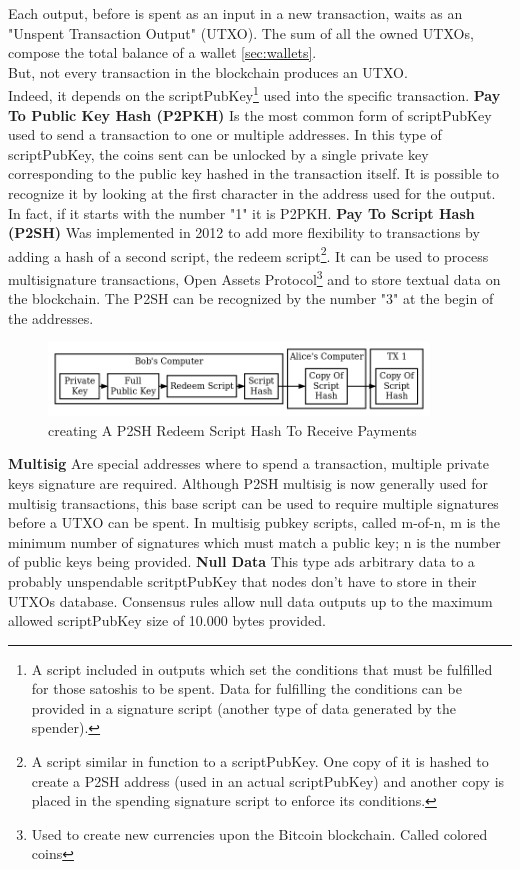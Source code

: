 Each output, before is spent as an input in a new transaction, waits as an "Unspent
Transaction Output" (UTXO). The sum of all the owned UTXOs, compose the total balance
of a wallet \ref{sec:wallets}.\\
But, not every transaction in the blockchain produces an UTXO.\\ 
Indeed, it depends on 
the scriptPubKey\footnote{A script included in outputs which set the conditions that 
must be fulfilled for those satoshis to be spent. Data for fulfilling the conditions 
can be provided in a signature script (another type of data generated by the spender).}
used into the specific transaction.
\bigskip 
\textbf{Pay To Public Key Hash (P2PKH)} 
Is the most common form of scriptPubKey used to send a transaction to one or multiple 
addresses. In this type of scriptPubKey, the coins sent can be unlocked by a single 
private key corresponding to the public key hashed in the transaction itself. It is 
possible to recognize it by looking at the first character in the address used for the
output. In fact, if it starts with the number "1" it is P2PKH.\cite{bitcoin.org}\pagebreak
\bigskip 
\textbf{Pay To Script Hash (P2SH)}
Was implemented in 2012 to add more flexibility to transactions by adding a hash 
of a second script, the redeem script\footnote{A script similar in function to a 
scriptPubKey. One copy of it is hashed to create a P2SH address (used in an actual 
scriptPubKey) and another copy is placed in the spending signature script to enforce 
its conditions.}. It can be used to process multisignature transactions, 
Open Assets Protocol\footnote{Used to create new currencies upon the Bitcoin blockchain. 
Called colored coins} and to store textual data on the blockchain. The P2SH can 
be recognized by the number "3" at the begin of the addresses.\cite{bitcoin.org}\\

\begin{figure}[h]
    \centering
    \includegraphics[width = 0.9\textwidth]{p2sh.png}
    \caption{creating A P2SH Redeem Script Hash To Receive Payments \cite{bitcoin.org}}
    \label{fig:p2sh}
\end{figure}\bigskip
\textbf{Multisig}
Are special addresses where to spend a transaction, multiple private keys signature are required.
Although P2SH multisig is now generally used for multisig transactions, this base 
script can be used to require multiple signatures before a UTXO can be spent.
In multisig pubkey scripts, called m-of-n, m is the minimum number of signatures 
which must match a public key; n is the number of public keys being provided.\cite{bitcoin.org}
\bigskip 
\textbf{Null Data}
This type ads arbitrary data to a probably unspendable scritptPubKey that nodes don't have
to store in their UTXOs database. Consensus rules allow null data outputs up to the maximum
allowed scriptPubKey size of 10.000 bytes provided.\cite{bitcoin.org}

